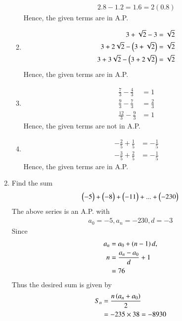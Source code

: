 \documentclass[journal,12pt,twocolumn]{IEEEtran}
\renewcommand\thesection{\arabic{section}}
\begin{document}
\begin{enumerate}[label=\thesection.\arabic*.,ref=\thesection.\theenumi]
\begin{enumerate}
\begin{align}
					2.8 - 1.2 = 1.6 = 2(0.8)
				\end{align}
				Hence, the given terms are in A.P.
			\item 
				\begin{align}
					3 + \sqrt{2} - 3 = \sqrt{2} \\
					3 + 2\sqrt{2} - \left(3+ \sqrt{2}\right)= \sqrt{2} \\
					3 + 3\sqrt{2} - \left(3+ 2\sqrt{2}\right)= \sqrt{2} 
				\end{align}
				Hence, the given terms are in A.P.
    \item 
	    \begin{align}
		    \frac{7}{3} -   \frac{4}{3} &= 1
		    \\
		     \frac{9}{3}-\frac{7}{3} &= \frac{2}{3}
		     \\
		    \frac{12}{3}-\frac{9}{3} &= 1
	    \end{align}
				Hence, the given terms are not in A.P.
			\item
				\begin{align}
					-\frac{2}{5} +   \frac{1}{5} &= -\frac{1}{5}
		    \\
					-\frac{3}{5} +   \frac{2}{5} &= -\frac{1}{5}
	    \end{align}
				Hence, the given terms are in A.P.
  
\end{enumerate}
    \item Find the sum
	    \begin{align}
    \begin{pmatrix}-5\end{pmatrix} + \begin{pmatrix}-8\end{pmatrix} + \begin{pmatrix}-11\end{pmatrix} + ... + \begin{pmatrix}-230\end{pmatrix}
	    \end{align}
	    \solution The above series is an A.P. with 
	    \begin{align}
		    a_0 = -5, a_n = -230, d = -3
	    \end{align}
	    Since 
	    \begin{align}
		    a_n &= a_0 + \left(n-1\right)d, 
		    \\
		    n &= \frac{a_n - a_0}{d} + 1
		    \\
		     &= 76
	    \end{align}
	    Thus the desired sum is given by 
	    \begin{align}
		    S_n &=  \frac{n\left(a_n + a_0\right)}{2}  
		    \\
		    &=  -235 \times 38 = -8930
	    \end{align}

    
    
\end{enumerate}
\end{document}
